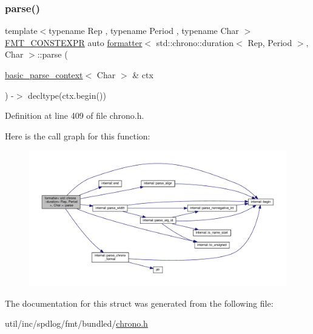 \subsubsection{\texorpdfstring{parse()}{parse()}}
{\footnotesize\ttfamily template$<$typename Rep , typename Period , typename Char $>$ \\
\hyperlink{core_8h_a69201cb276383873487bf68b4ef8b4cd}{F\+M\+T\+\_\+\+C\+O\+N\+S\+T\+E\+X\+PR} auto \hyperlink{structformatter}{formatter}$<$ std\+::chrono\+::duration$<$ Rep, Period $>$, Char $>$\+::parse (\begin{DoxyParamCaption}\item[{\hyperlink{classbasic__parse__context}{basic\+\_\+parse\+\_\+context}$<$ Char $>$ \&}]{ctx }\end{DoxyParamCaption}) -\/$>$ decltype(ctx.\+begin()) \hspace{0.3cm}{\ttfamily [inline]}}



Definition at line 409 of file chrono.\+h.

Here is the call graph for this function\+:
\nopagebreak
\begin{figure}[H]
\begin{center}
\leavevmode
\includegraphics[width=350pt]{structformatter_3_01std_1_1chrono_1_1duration_3_01_rep_00_01_period_01_4_00_01_char_01_4_a0b4553a087ee08ec032965fe1fc35ff4_cgraph}
\end{center}
\end{figure}


The documentation for this struct was generated from the following file\+:\begin{DoxyCompactItemize}
\item 
util/inc/spdlog/fmt/bundled/\hyperlink{chrono_8h}{chrono.\+h}\end{DoxyCompactItemize}
